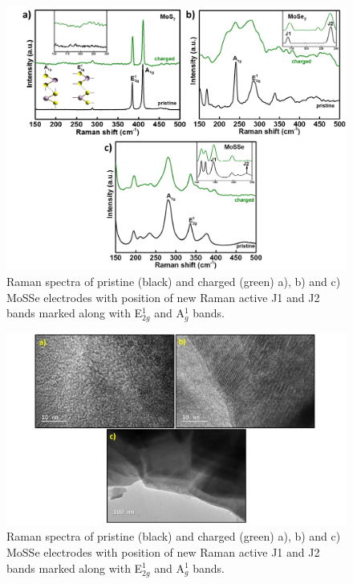 \begin{figure}
  \centering
  \includegraphics[width=\textwidth]{Figures/chap4fig/fig5}
  \caption{Raman spectra of pristine (black) and charged (green) a), b)  and c) MoSSe electrodes with position of new Raman active J1 and J2 bands marked along with E$^1_{2g}$ and A$^1_g$ bands.}
  \label{Figures/chap4fig:fig5}
\end{figure}

\begin{figure}
  \centering
  \includegraphics[width=\textwidth]{Figures/chap4fig/mose2tem}
  \caption{Raman spectra of pristine (black) and charged (green) a), b)  and c) MoSSe electrodes with position of new Raman active J1 and J2 bands marked along with E$^1_{2g}$ and A$^1_g$ bands.}
  \label{Figures/chap4fig:mose2tem}
\end{figure}
